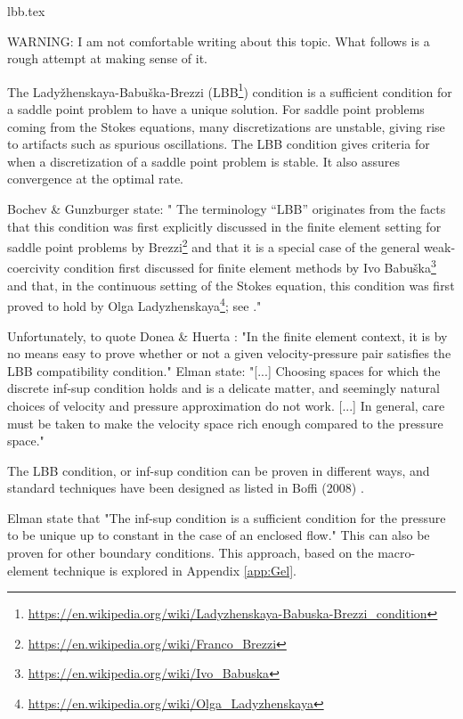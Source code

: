 \begin{flushright} {\tiny {\color{gray} lbb.tex}} \end{flushright}

WARNING: I am not comfortable writing about this topic. What follows is a rough attempt at making sense of it.

The Lady{\v z}henskaya-Babu{\v s}ka-Brezzi (LBB\footnote{
\url{https://en.wikipedia.org/wiki/Ladyzhenskaya-Babuska-Brezzi_condition}}) condition is a sufficient 
condition for a saddle point problem to have a unique solution.
For saddle point problems coming from the Stokes equations, 
many discretizations are unstable, giving rise to artifacts such as spurious oscillations. 
The LBB condition gives criteria for when a discretization of a saddle point problem is stable. 
It also assures convergence at the optimal rate. 

Bochev \& Gunzburger \cite{bogu09} state: "
The terminology “LBB” originates from the facts that this condition was first explicitly discussed
in the finite element setting for saddle point problems by Brezzi\footnote{
\url{https://en.wikipedia.org/wiki/Franco_Brezzi}} \cite{brez74} and that it is a special case of
the general weak-coercivity condition first discussed for finite element methods by Ivo Babu{\v s}ka\footnote{
\url{https://en.wikipedia.org/wiki/Ivo_Babuska}}
\cite{babu71} and that, in the continuous setting of the Stokes equation, this condition was first proved to
hold by Olga Ladyzhenskaya\footnote{\url{https://en.wikipedia.org/wiki/Olga_Ladyzhenskaya}}; see \cite{lady69}."

Unfortunately, to quote Donea \& Huerta \cite{dohu03}: 
"In the finite element context, it is by no means easy to prove whether or not a given
velocity-pressure pair satisfies the LBB compatibility condition."
Elman \etal state: "[...] Choosing spaces for which the discrete inf-sup condition holds
and is a delicate matter, and seemingly natural choices of velocity and pressure approximation
do not work. [...] In general, care must be taken to make the velocity space 
rich enough compared to the pressure space."

The LBB condition, or inf-sup condition can be proven in different ways, 
and standard techniques have been designed
as listed in Boffi \etal (2008) \cite{bobf08}.

Elman \etal \cite{elsw} state that "The inf-sup condition is a sufficient condition 
for the pressure to be unique up
to  constant in the case of an enclosed flow." This can also be proven for other boundary conditions.
This approach, based on the macro-element technique \cite{sten90} is explored in Appendix \ref{app:Gel}.


